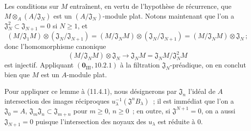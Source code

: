 
Les conditions sur $M$ entraînent, en vertu de l'hypothèse de récurrence, que
$M\otimes_A(A/\mathfrak J_N)$ est un $(A/\mathfrak J_N)$-module plat. Notons
maintenant que l'on a $\mathfrak J_N^2\subset\mathfrak J_{N+1}=0$ si $N\geq1$,
et
\[
(M/\mathfrak J_1M)\otimes(\mathfrak J_N/\mathfrak J_{N+1})
=(M/\mathfrak J_NM)\otimes(\mathfrak J_N/\mathfrak J_{N+1})
=(M/\mathfrak J_NM)\otimes\mathfrak J_N\,;
\]
donc l'homomorphisme canonique
\[
(M/\mathfrak J_NM)\otimes\mathfrak J_N
\longrightarrow\mathfrak J_NM=\mathfrak J_NM/\mathfrak J_N^2M
\]
est injectif. Appliquant $(\mathbf 0_{\mathrm{III}},10.2.1)$ à la filtration
$\mathfrak J_N$-préadique, on en conclut bien que $M$ est un $A$-module plat.

Pour appliquer ce lemme à (11.4.1), nous désignerons par $\mathfrak J_n$
l'idéal de $A$ intersection des images réciproques
$u_\lambda^{-1}(\mathfrak J^nB_\lambda)$~; il est immédiat que l'on a
$\mathfrak J_0=A$, $\mathfrak J_m\mathfrak J_n\subset\mathfrak J_{m+n}$ pour
$m\geq0$, $n\geq0$~; en outre, si $\mathfrak J^{N+1}=0$, on a aussi
$\mathfrak J_{N+1}=0$ puisque l'intersection des noyaux des $u_\lambda$ est
réduite à $0$.

